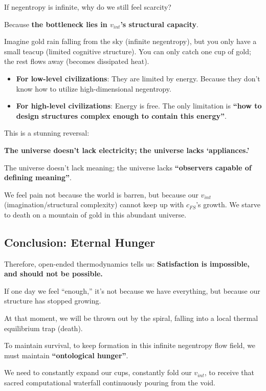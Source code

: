 If negentropy is infinite, why do we still feel scarcity?

Because \textbf{the bottleneck lies in $v_{int}$'s structural capacity}.

Imagine gold rain falling from the sky (infinite negentropy), but you only have a small teacup (limited cognitive structure). You can only catch one cup of gold; the rest flows away (becomes dissipated heat).

\begin{itemize}
\item \textbf{For low-level civilizations}: They are limited by energy. Because they don't know how to utilize high-dimensional negentropy.

\item \textbf{For high-level civilizations}: Energy is free. The only limitation is \textbf{``how to design structures complex enough to contain this energy''}.
\end{itemize}

This is a stunning reversal:

\textbf{The universe doesn't lack electricity; the universe lacks `appliances.'}

The universe doesn't lack meaning; the universe lacks \textbf{``observers capable of defining meaning''}.

We feel pain not because the world is barren, but because our $v_{int}$ (imagination/structural complexity) cannot keep up with $c_{FS}$'s growth. We starve to death on a mountain of gold in this abundant universe.

\subsection{Conclusion: Eternal Hunger}

Therefore, open-ended thermodynamics tells us: \textbf{Satisfaction is impossible, and should not be possible.}

If one day we feel ``enough,'' it's not because we have everything, but because our structure has stopped growing.

At that moment, we will be thrown out by the spiral, falling into a local thermal equilibrium trap (death).

To maintain survival, to keep formation in this infinite negentropy flow field, we must maintain \textbf{``ontological hunger''}.

We need to constantly expand our cups, constantly fold our $v_{int}$, to receive that sacred computational waterfall continuously pouring from the void.

